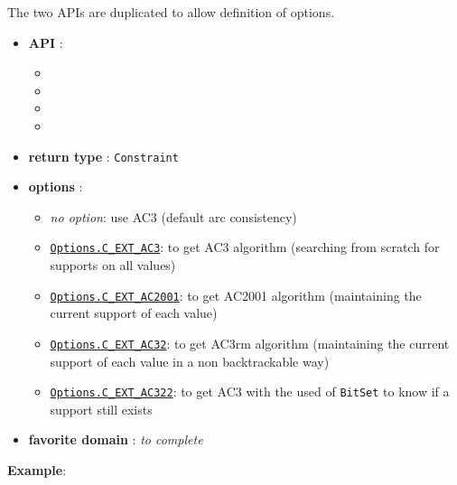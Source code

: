The two APIs are duplicated to allow definition of options.
\begin{itemize}
	\item \textbf{API} :
	\begin{itemize}
		\item {}
		\item {}
		\item {}
		\item {}
	\end{itemize}
	\item \textbf{return type} : \texttt{Constraint}
	\item \textbf{options} :
	\begin{itemize}
		\item \emph{no option}: use AC3 (default arc consistency)
		\item \hyperlink{cext3:cext3options}{\tt Options.C\_EXT\_AC3}: to get AC3 algorithm (searching from scratch for supports on all values)
		\item \hyperlink{cext2001:cext2001options}{\tt Options.C\_EXT\_AC2001}: to get AC2001 algorithm (maintaining the current support of each value)
		\item \hyperlink{cext32:cext32options}{\tt Options.C\_EXT\_AC32}: to get AC3rm algorithm (maintaining the current support of each value in a non backtrackable way)
		\item \hyperlink{cext322:cext322options}{\tt Options.C\_EXT\_AC322}: to get AC3 with the used of \texttt{BitSet} to know if a support still exists
	\end{itemize}
	\item \textbf{favorite domain} : \emph{to complete}
\end{itemize}

\textbf{Example}:

